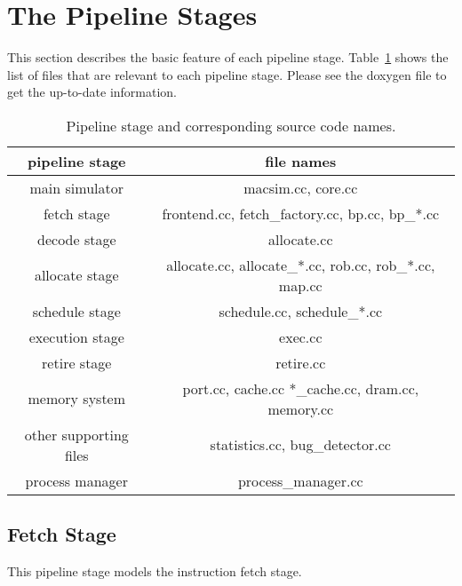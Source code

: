 
\clearpage
\section{The Pipeline Stages}

This section describes the basic feature of each pipeline stage. 
Table~\ref{table:pipeline} shows the list of files that are relevant to each pipeline stage. 
Please see the doxygen file to get the up-to-date information. 


\begin{table}[htb]
\begin{center}
\caption{Pipeline stage and corresponding source code names.}
\label{table:pipeline}
\begin{tabular}{|c||c|}
\hline 
pipeline stage         & file names                                             \\ \hline \hline 
main simulator         & macsim.cc, core.cc                                     \\ \hline 
fetch stage            & frontend.cc, fetch\_factory.cc, bp.cc, bp\_*.cc        \\ \hline 
decode stage           & allocate.cc                                            \\ \hline 
allocate stage         & allocate.cc, allocate\_*.cc, rob.cc, rob\_*.cc, map.cc \\ \hline 
schedule stage         & schedule.cc, schedule\_*.cc                            \\ \hline 
execution stage        & exec.cc                                                \\ \hline 
retire stage           & retire.cc                                              \\ \hline 
memory system          & port.cc, cache.cc *\_cache.cc, dram.cc, memory.cc      \\ \hline \hline
other supporting files & statistics.cc, bug\_detector.cc                        \\ \hline \hline 
process manager        & process\_manager.cc                                    \\ \hline 
\end{tabular}
\end{center}
\end{table}



\subsection{Fetch Stage}
This pipeline stage models the instruction fetch stage. 

